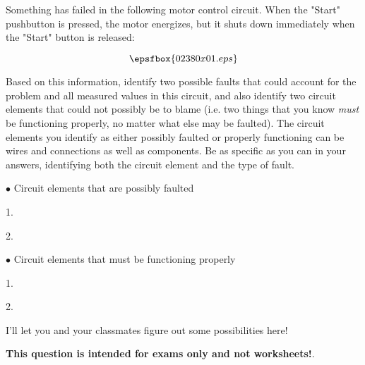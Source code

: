 

Something has failed in the following motor control circuit.  When the "Start" pushbutton is pressed, the motor energizes, but it shuts down immediately when the "Start" button is released:

$$\epsfbox{02380x01.eps}$$

Based on this information, identify two possible faults that could account for the problem and all measured values in this circuit, and also identify two circuit elements that could not possibly be to blame (i.e. two things that you know {\it must} be functioning properly, no matter what else may be faulted).  The circuit elements you identify as either possibly faulted or properly functioning can be wires and connections as well as components.  Be as specific as you can in your answers, identifying both the circuit element and the type of fault.

\medskip
\goodbreak
\item{$\bullet$} Circuit elements that are possibly faulted
\item{1.} 
\item{2.} 
\medskip

\medskip
\goodbreak
\item{$\bullet$} Circuit elements that must be functioning properly
\item{1.} 
\item{2.} 
\medskip







I'll let you and your classmates figure out some possibilities here!







{\bf This question is intended for exams only and not worksheets!}.




